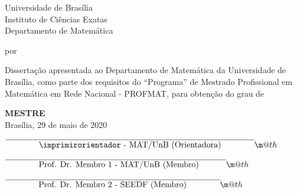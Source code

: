 \documentclass[12pt, openright, a4paper, brazil, english, french, spanish, bibjustif, openany, oneside]{abntex2}
\makeatletter
\newcommand*{\textoverline}[1]{$\overline{\hbox{#1}}\m@th$}
\makeatother
\begin{document}
\begin{folhadeaprovacao}

\begin{center}
 Universidade de Bras\'ilia \\
 Instituto de Ci\^encias Exatas \\
 Departamento de Matem\'atica
\end{center}
\begin{center}
    \vspace{0.3cm}
 \LARGE{\textbf{\imprimirtitulo}}
    \vspace{0.3cm}
\end{center}
\begin{center}
 por \\
    \vspace{0.5cm}
 \LARGE{\textbf{\imprimirautor}}
\end{center}

    \vspace{0.5cm}
\noindent Disserta\c c\~ao apresentada ao Departamento de Matem\'atica da Universidade de Bras\'ilia,
como parte dos requisitos do ``Programa'' de Mestrado Profissional em Matem\'atica em Rede 
Nacional - PROFMAT, para obten\c c\~ao do grau de 
\begin{center}
    \vspace{0.2cm}
 \LARGE{\textbf{MESTRE}}\\
    \vspace{0.5cm}
 Bras\'ilia, 29 de maio de 2020
\end{center}

    \vspace{1.5cm}

\vspace*{8mm}

\textoverline{\phantom{xxxxxxx} \imprimirorientador - MAT/UnB (Orientadora)\phantom{xxxxxxx}  }

\vspace*{1cm}

\textoverline{\phantom{xxxxxxx} Prof. Dr. Membro 1 - MAT/UnB (Membro) \phantom{xxxxx} }

\vspace*{1cm}

\textoverline{\phantom{xxxxxxx} Prof. Dr. Membro 2 - SEEDF (Membro)\phantom{xxxxxxx}  }

\vspace*{1cm}

\vspace*{1cm}

\end{folhadeaprovacao}
\end{document}
